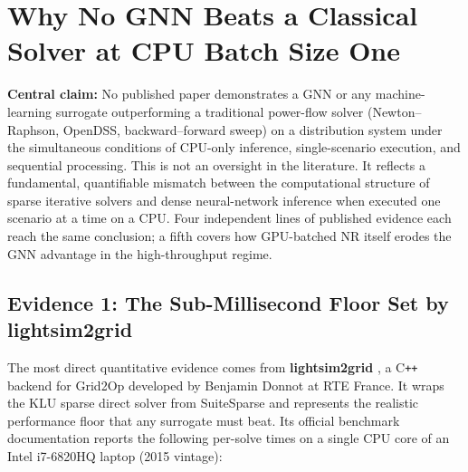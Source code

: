\documentclass[11pt]{article}
\begin{document}
\section{Why No GNN Beats a Classical Solver at CPU Batch Size One}
\label{sec:impossibility}

\noindent\textbf{Central claim:} No published paper demonstrates a GNN or any
machine-learning surrogate outperforming a traditional power-flow solver
(Newton--Raphson, OpenDSS, backward--forward sweep) on a distribution system
under the simultaneous conditions of CPU-only inference, single-scenario
execution, and sequential processing.  This is not an oversight in the
literature.  It reflects a fundamental, quantifiable mismatch between the
computational structure of sparse iterative solvers and dense neural-network
inference when executed one scenario at a time on a CPU.  Four independent
lines of published evidence each reach the same conclusion; a fifth covers
how GPU-batched NR itself erodes the GNN advantage in the high-throughput
regime.

\subsection{Evidence 1: The Sub-Millisecond Floor Set by lightsim2grid}

The most direct quantitative evidence comes from \textbf{lightsim2grid}
\cite{lightsim2grid}, a C\texttt{++} backend for Grid2Op developed by
Benjamin Donnot at RTE France.  It wraps the KLU sparse direct solver from
SuiteSparse and represents the realistic performance floor that any surrogate
must beat.  Its official benchmark documentation reports the following
per-solve times on a single CPU core of an Intel i7-6820HQ laptop
(2015 vintage):
\end{document}
